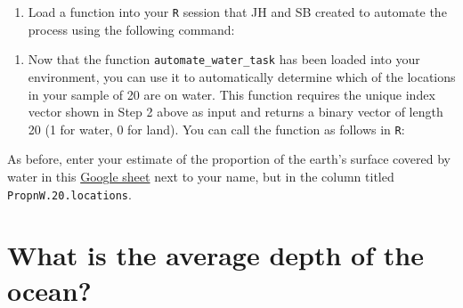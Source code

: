 \documentclass[letterpaper,12pt,twoside,]{pinp}
\providecommand{\tightlist}{%
  \setlength{\itemsep}{0pt}\setlength{\parskip}{0pt}}
\begin{document}
\begin{enumerate}
\def\labelenumi{\arabic{enumi}.}
\setcounter{enumi}{2}
\tightlist
\item
  Load a function into your \texttt{R} session that JH and SB created to
  automate the process using the following command:
\end{enumerate}

\begin{Shaded}
\begin{Highlighting}[]
\NormalTok{(}\NormalTok{)}
\end{Highlighting}
\end{Shaded}

\begin{enumerate}
\def\labelenumi{\arabic{enumi}.}
\setcounter{enumi}{3}
\tightlist
\item
  Now that the function \texttt{automate\_water\_task} has been loaded
  into your environment, you can use it to automatically determine which
  of the locations in your sample of 20 are on water. This function
  requires the unique index vector shown in Step 2 above as input and
  returns a binary vector of length 20 (1 for water, 0 for land). You
  can call the function as follows in \texttt{R}:
\end{enumerate}

\begin{Shaded}
\begin{Highlighting}[]
\StringTok{ }\NormalTok{(}\NormalTok{)}
\end{Highlighting}
\end{Shaded}

As before, enter your estimate of the proportion of the earth's surface
covered by water in this
\href{https://docs.google.com/spreadsheets/d/1Mnxeq9nQcTdQycZ7S_62fYFiNC5_a3fibsyodzfwO58/edit?usp=sharing}{Google
sheet} next to your name, but in the column titled
\texttt{PropnW.20.locations}.

\hypertarget{what-is-the-average-depth-of-the-ocean}{%
\section{What is the average depth of the
ocean?}\label{what-is-the-average-depth-of-the-ocean}}
\end{document}

